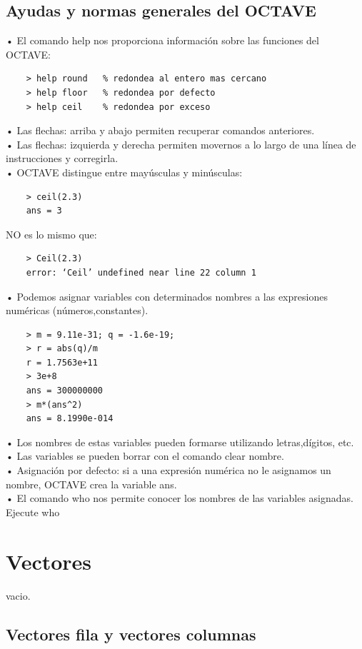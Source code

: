 \documentclass[a4,12pt]{article}
\begin{document}
\subsection{Ayudas y normas generales del OCTAVE}

• El comando help nos proporciona información sobre las funciones del OCTAVE:\\
\begin{verbatim}
    > help round   % redondea al entero mas cercano
    > help floor   % redondea por defecto
    > help ceil    % redondea por exceso
\end{verbatim}
• Las flechas: arriba y abajo permiten recuperar comandos anteriores.\\
• Las flechas: izquierda y derecha permiten movernos a lo largo de una línea de instrucciones y corregirla.\\
• OCTAVE distingue entre mayúsculas y minúsculas:\\
\begin{verbatim}
    > ceil(2.3)
    ans = 3
\end{verbatim}
NO es lo mismo que:\\
\begin{verbatim}
    > Ceil(2.3)
    error: ‘Ceil’ undefined near line 22 column 1
\end{verbatim}
• Podemos asignar variables con determinados nombres a las expresiones numéricas (números,constantes).\\
\begin{verbatim}
    > m = 9.11e-31; q = -1.6e-19;
    > r = abs(q)/m
    r = 1.7563e+11
    > 3e+8
    ans = 300000000
    > m*(ans^2)
    ans = 8.1990e-014
\end{verbatim}
• Los nombres de estas variables pueden formarse utilizando letras,dígitos, etc.\\
• Las variables se pueden borrar con el comando clear nombre.\\
• Asignación por defecto: si a una expresión numérica no le asignamos un nombre, OCTAVE crea la variable ans.\\
• El comando who nos permite conocer los nombres de las variables asignadas. Ejecute who\\

\section{Vectores}

vacio.

\subsection{Vectores fila y vectores columnas}
\end{document}
